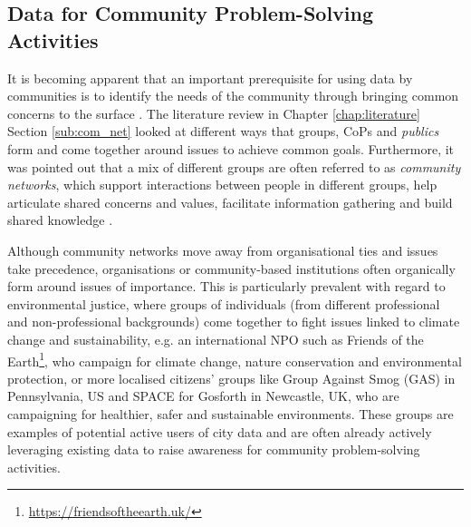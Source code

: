 \subsection{Data for Community Problem-Solving Activities}
It is becoming apparent that an important prerequisite for using data by communities is to identify the needs of the community through bringing common concerns to the surface \citep{marres_issues_2007}. The literature review in Chapter \ref{chap:literature} Section \ref{sub:com_net} looked at different ways that groups, CoPs \citep{lave_situated_1991} and \textit{publics} \citep{dewey_public_1954} form and come together around issues to achieve common goals. Furthermore, it was pointed out that a mix of different groups are often referred to as \textit{community networks}, which support interactions between people in different groups, help articulate shared concerns and values, facilitate information gathering and build shared knowledge \citep{carroll_trajectory_2003}.

Although community networks move away from organisational ties and issues take precedence, organisations or community-based institutions \citep{carroll_trajectory_2003} often organically form around issues of importance. This is particularly prevalent with regard to environmental justice, where groups of individuals (from different professional and non-professional backgrounds) come together to fight issues linked to climate change and sustainability, e.g. an international NPO such as Friends of the Earth\footnote{\url{https://friendsoftheearth.uk/}}, who campaign for climate change, nature conservation and environmental protection, or more localised citizens' groups like Group Against Smog (GAS) in Pennsylvania, US and SPACE for Gosforth in Newcastle, UK, who are campaigning for healthier, safer and sustainable environments. These groups are examples of potential active users of city data and are often already actively leveraging existing data to raise awareness for community problem-solving activities.

